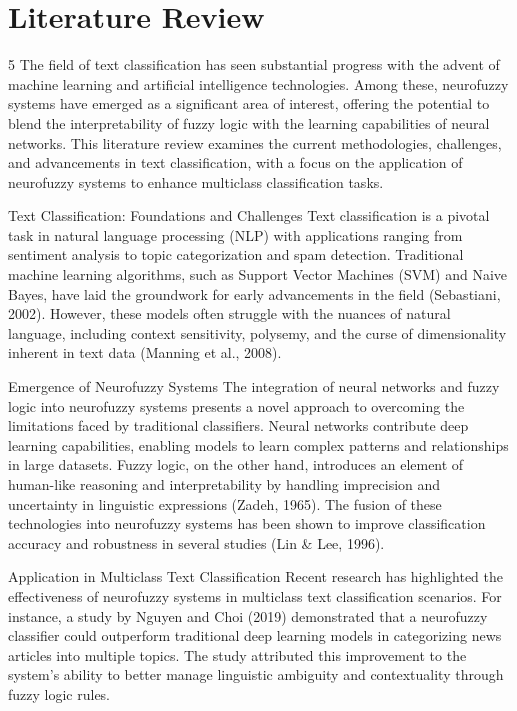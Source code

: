 \section{Literature Review}
5
The field of text classification has seen substantial progress with the advent of machine learning and artificial intelligence technologies. Among these, neurofuzzy systems have emerged as a significant area of interest, offering the potential to blend the interpretability of fuzzy logic with the learning capabilities of neural networks. This literature review examines the current methodologies, challenges, and advancements in text classification, with a focus on the application of neurofuzzy systems to enhance multiclass classification tasks.

Text Classification: Foundations and Challenges
Text classification is a pivotal task in natural language processing (NLP) with applications ranging from sentiment analysis to topic categorization and spam detection. Traditional machine learning algorithms, such as Support Vector Machines (SVM) and Naive Bayes, have laid the groundwork for early advancements in the field (Sebastiani, 2002). However, these models often struggle with the nuances of natural language, including context sensitivity, polysemy, and the curse of dimensionality inherent in text data (Manning et al., 2008).

Emergence of Neurofuzzy Systems
The integration of neural networks and fuzzy logic into neurofuzzy systems presents a novel approach to overcoming the limitations faced by traditional classifiers. Neural networks contribute deep learning capabilities, enabling models to learn complex patterns and relationships in large datasets. Fuzzy logic, on the other hand, introduces an element of human-like reasoning and interpretability by handling imprecision and uncertainty in linguistic expressions (Zadeh, 1965). The fusion of these technologies into neurofuzzy systems has been shown to improve classification accuracy and robustness in several studies (Lin \& Lee, 1996).

Application in Multiclass Text Classification
Recent research has highlighted the effectiveness of neurofuzzy systems in multiclass text classification scenarios. For instance, a study by Nguyen and Choi (2019) demonstrated that a neurofuzzy classifier could outperform traditional deep learning models in categorizing news articles into multiple topics. The study attributed this improvement to the system's ability to better manage linguistic ambiguity and contextuality through fuzzy logic rules.

